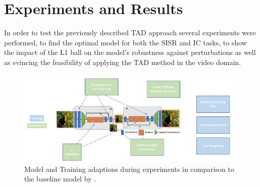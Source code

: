 \newpage
\chapter{Experiments and Results}
\label{sec:ExperimentsandResults}
In order to test the previously described \ac{TAD} approach several experiments were performed, to find the optimal model for both the \ac{SISR} and \ac{IC} tasks, to show the impact of the L1 ball on the model's robustness against perturbations as well as evincing the feasibility of applying the \ac{TAD} method in the video domain.

\begin{figure}[!htbp]
	\centering
	\includegraphics[width=14cm]{figures/model_adaptions}
	\caption{Model and Training adaptions during experiments in comparison
  to the baseline model by \cite{TAID}.}
  \label{fig:model_adaptions}
\end{figure}

